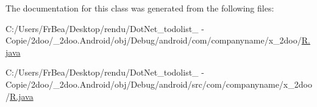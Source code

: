 The documentation for this class was generated from the following files:\begin{CompactItemize}
\item 
C:/Users/FrBea/Desktop/rendu/DotNet\_\-todolist\_ - Copie/2doo/\_\-2doo.Android/obj/Debug/android/com/companyname/x\_\-2doo/\hyperlink{com_2companyname_2x__2doo_2_r_8java}{R.java}\item 
C:/Users/FrBea/Desktop/rendu/DotNet\_\-todolist\_ - Copie/2doo/\_\-2doo.Android/obj/Debug/android/src/com/companyname/x\_\-2doo/\hyperlink{src_2com_2companyname_2x__2doo_2_r_8java}{R.java}\end{CompactItemize}
